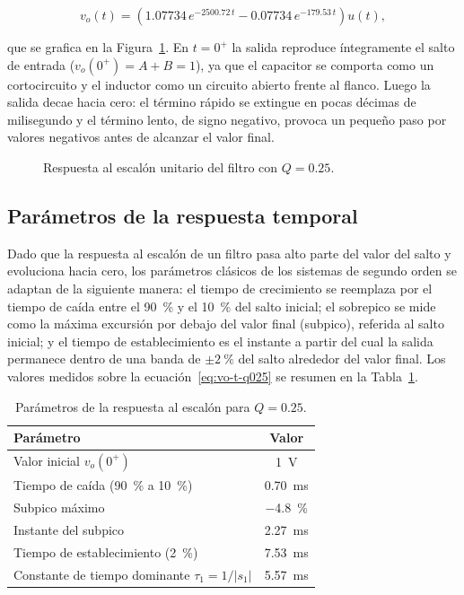 \begin{equation}
  v_o(t) = \left(\num{1.07734}\, e^{-\num{2500.72}\, t} - \num{0.07734}\, e^{-\num{179.53}\, t}\right) u(t),
  \label{eq:vo-t-q025}
\end{equation}

que se grafica en la Figura~\ref{fig:escalon-q025}. En $t = 0^+$ la salida reproduce íntegramente el salto
de entrada ($v_o(0^+) = A + B = 1$), ya que el capacitor se comporta como un cortocircuito y el inductor
como un circuito abierto frente al flanco. Luego la salida decae hacia cero: el término rápido se extingue
en pocas décimas de milisegundo y el término lento, de signo negativo, provoca un pequeño paso por valores
negativos antes de alcanzar el valor final.

\begin{figure}[!ht]
  \centering
  
  \caption{Respuesta al escalón unitario del filtro con $Q = \num{0.25}$.}
  \label{fig:escalon-q025}
\end{figure}

\subsection{Parámetros de la respuesta temporal}

Dado que la respuesta al escalón de un filtro pasa alto parte del valor del salto y evoluciona hacia cero,
los parámetros clásicos de los sistemas de segundo orden se adaptan de la siguiente manera: el tiempo de
crecimiento se reemplaza por el tiempo de caída entre el \qty{90}{\percent} y el \qty{10}{\percent} del
salto inicial; el sobrepico se mide como la máxima excursión por debajo del valor final (subpico),
referida al salto inicial; y el tiempo de establecimiento es el instante a partir del cual la salida
permanece dentro de una banda de $\pm\qty{2}{\percent}$ del salto alrededor del valor final. Los valores
medidos sobre la ecuación~\eqref{eq:vo-t-q025} se resumen en la Tabla~\ref{tab:parametros-q025}.

\begin{table}[!ht]
  \centering
  \begin{tabular}{|l|c|}
    \hline
    Parámetro & Valor \\
    \hline
    Valor inicial $v_o(0^+)$                              & \qty{1}{\volt} \\
    Tiempo de caída (\qty{90}{\percent} a \qty{10}{\percent}) & \qty{0.70}{\milli\second} \\
    Subpico máximo                                        & \qty{-4.8}{\percent} \\
    Instante del subpico                                  & \qty{2.27}{\milli\second} \\
    Tiempo de establecimiento (\qty{2}{\percent})         & \qty{7.53}{\milli\second} \\
    Constante de tiempo dominante $\tau_1 = 1/|s_1|$      & \qty{5.57}{\milli\second} \\
    \hline
  \end{tabular}
  \caption{Parámetros de la respuesta al escalón para $Q = \num{0.25}$.}
  \label{tab:parametros-q025}
\end{table}

